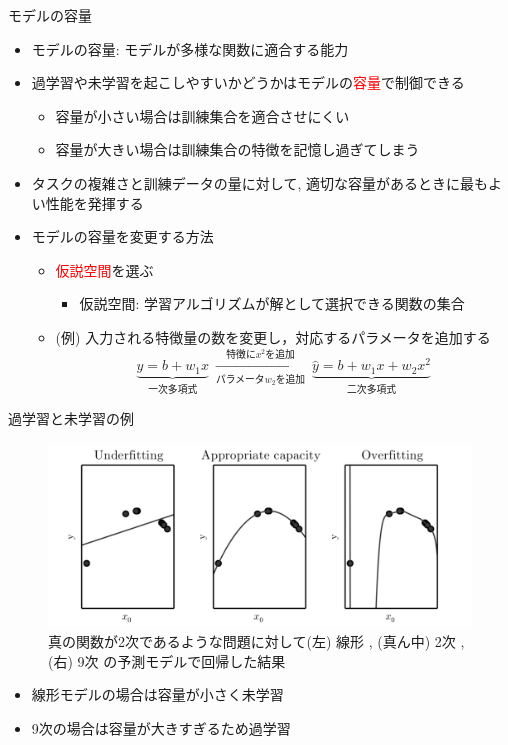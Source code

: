 \documentclass[dvipdfmx, 10pt]{beamer}
\newcommand{\green}[1]{\textcolor{green!40!black}{#1}}
\newcommand{\blue}[1]{\textcolor{blue!80!black}{#1}}
\begin{document}
\begin{frame}{モデルの容量}
  \begin{itemize}
    \item \blue{モデルの容量}: モデルが多様な関数に適合する能力
    \item 過学習や未学習を起こしやすいかどうかはモデルの\textcolor{red}{容量}で制御できる
    \begin{itemize}
      \item 容量が小さい場合は訓練集合を適合させにくい
      \item 容量が大きい場合は訓練集合の特徴を記憶し過ぎてしまう
    \end{itemize}
    \item タスクの複雑さと訓練データの量に対して, 適切な容量があるときに最もよい性能を発揮する
    \item モデルの容量を変更する方法
    \begin{itemize}
      \item \textcolor{red}{仮説空間}を選ぶ
		  \begin{itemize}
		  \item 仮説空間: 学習アルゴリズムが解として選択できる関数の集合
		  \end{itemize}
	  \item (例) 入力される特徴量の数を変更し，対応するパラメータを追加する
	  \[
	  \underbrace{\hat{y}=b+w_1 x}_{\text{一次多項式}}
	  ~\underset{\text{パラメータ$w_2$を追加}}{\overset{\text{特徴に$x^2$を追加}}{\to}}~
	  \underbrace{\hat{y}=b+w_1 x+w_2 x^2}_{\text{二次多項式}}
	  \]
    \end{itemize}
  \end{itemize}
\end{frame}


\begin{frame}{過学習と未学習の例}
  \begin{figure}
     \includegraphics[width=0.8\linewidth]{./images/over-under-fitting.png}
     \caption{真の関数が2次であるような問題に対して(左) 線形 , (真ん中) 2次 , (右) 9次 の予測モデルで回帰した結果}
  \end{figure}
  \begin{itemize}
    \item 線形モデルの場合は容量が小さく未学習
    \item 9次の場合は容量が大きすぎるため過学習
  \end{itemize}
\end{frame}
\end{document}
